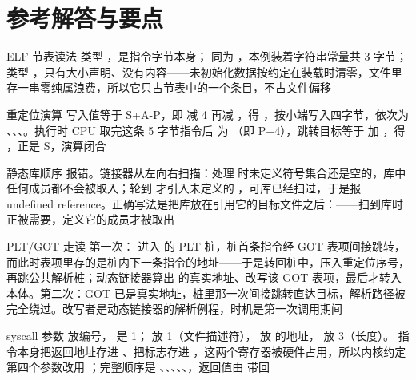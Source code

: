 \section*{参考解答与要点}

\begin{chapteranswer}{ELF 节表读法}
 类型 ，是指令字节本身； 同为 ，本例装着字符串常量共 3 字节； 类型 ，只有大小声明、没有内容——未初始化数据按约定在装载时清零，文件里存一串零纯属浪费，所以它只占节表中的一个条目，不占文件偏移
\end{chapteranswer}

\begin{chapteranswer}{重定位演算}
写入值等于 S+A-P，即  减 4 再减 ，得 ，按小端写入四字节，依次为 、、、。执行时 CPU 取完这条 5 字节指令后  为 （即 P+4），跳转目标等于  加 ，得 ，正是 S，演算闭合
\end{chapteranswer}

\begin{chapteranswer}{静态库顺序}
 报错。链接器从左向右扫描：处理  时未定义符号集合还是空的，库中任何成员都不会被取入；轮到  才引入未定义的 ，可库已经扫过，于是报 undefined reference。正确写法是把库放在引用它的目标文件之后：——扫到库时  正被需要，定义它的成员才被取出
\end{chapteranswer}

\begin{chapteranswer}{PLT/GOT 走读}
第一次： 进入  的 PLT 桩，桩首条指令经 GOT 表项间接跳转，而此时表项里存的是桩内下一条指令的地址——于是转回桩中，压入重定位序号，再跳公共解析桩；动态链接器算出  的真实地址、改写该 GOT 表项，最后才转入  本体。第二次：GOT 已是真实地址，桩里那一次间接跳转直达目标，解析路径被完全绕过。改写者是动态链接器的解析例程，时机是第一次调用期间
\end{chapteranswer}

\begin{chapteranswer}{syscall 参数}
 放编号， 是 1； 放 1（文件描述符）， 放  的地址， 放 3（长度）。 指令本身把返回地址存进 、把标志存进 ，这两个寄存器被硬件占用，所以内核约定第四个参数改用 ；完整顺序是 、、、、、，返回值由  带回
\end{chapteranswer}

